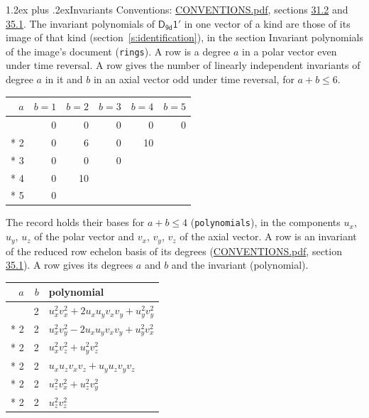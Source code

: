 \documentclass[10pt,a4paper]{article}
\makeatletter
\renewcommand\section{\@startsection{section}{1}{\z@}{-3ex plus -1ex minus -.2ex}%
  {1.2ex plus .2ex}{\normalfont\large\sffamily\bfseries\color{parttitle}}}
\numberwithin{equation}{section}
\newcommand{\grp}[1]{\mathsf{#1}}
\makeatother
\begin{document}
\section{Invariants}\label{s:invariants}
Conventions: \href{../../CONVENTIONS.pdf}{CONVENTIONS.pdf}, sections \href{../../CONVENTIONS.pdf\#conv.31.2}{31.2} and \href{../../CONVENTIONS.pdf\#conv.35.1}{35.1}.
The invariant polynomials of $\grp{D_{9d}1'}$ in one vector of a kind are those of its image of that kind (section~\ref{s:identification}), in the section Invariant polynomials of the image's document (\texttt{rings}).
\leavevmode\label{n:index.degree.polar}\label{n:index.degree.axial}A row is a degree $a$ in a polar vector even under time reversal. A row gives the number of linearly independent invariants of degree $a$ in it and $b$ in an axial vector odd under time reversal, for $a + b \le 6$.
{\small\begin{longtable}{@{}rrrrrr@{}}\toprule
$a$ & $b = 1$ & $b = 2$ & $b = 3$ & $b = 4$ & $b = 5$\\\midrule\endhead
\bottomrule\endfoot\endlastfoot
1 & 0 & 0 & 0 & 0 & 0\\*
2 & 0 & 6 & 0 & 10 & \\*
3 & 0 & 0 & 0 &  & \\*
4 & 0 & 10 &  &  & \\*
5 & 0 &  &  &  & \\
\bottomrule\end{longtable}}
\leavevmode\label{n:local.component.polar}\label{n:local.component.axial}The record holds their bases for $a + b \le 4$ (\texttt{polynomials}), in the components $u_{x}$, $u_{y}$, $u_{z}$ of the polar vector and $v_{x}$, $v_{y}$, $v_{z}$ of the axial vector. \label{n:head.polynomial}A row is an invariant of the reduced row echelon basis of its degrees (\href{../../CONVENTIONS.pdf}{CONVENTIONS.pdf}, section \href{../../CONVENTIONS.pdf\#conv.35.1}{35.1}). A row gives its degrees $a$ and $b$ and the invariant (polynomial).
{\small\renewcommand{\arraystretch}{1.2}\begin{longtable}{@{}rrl@{}}\toprule
$a$ & $b$ & polynomial\\\midrule\endhead
\bottomrule\endfoot\endlastfoot
2 & 2 & $u_{x}^{2}v_{x}^{2} + 2u_{x}u_{y}v_{x}v_{y} + u_{y}^{2}v_{y}^{2}$\\*
2 & 2 & $u_{x}^{2}v_{y}^{2} - 2u_{x}u_{y}v_{x}v_{y} + u_{y}^{2}v_{x}^{2}$\\*
2 & 2 & $u_{x}^{2}v_{z}^{2} + u_{y}^{2}v_{z}^{2}$\\*
2 & 2 & $u_{x}u_{z}v_{x}v_{z} + u_{y}u_{z}v_{y}v_{z}$\\*
2 & 2 & $u_{z}^{2}v_{x}^{2} + u_{z}^{2}v_{y}^{2}$\\*
2 & 2 & $u_{z}^{2}v_{z}^{2}$\\
\bottomrule\end{longtable}}
\end{document}
